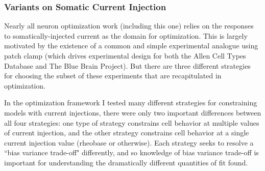 \subsubsection{Variants on Somatic Current Injection}
Nearly all neuron optimization work (including this one) relies on the responses to somatically-injected current as the domain for optimization.
This is largely motivated by the existence of a common and simple experimental analogue using patch clamp (which drives experimental design for both the Allen Cell Types Database and The Blue Brain Project).
But there are three different strategies for choosing the subset of these experiments that are recapitulated in optimization.





In the optimization framework I tested many different strategies for constraining models with current injections, there were only two important differences between all four strategies: one type of strategy constrains cell behavior at multiple values of current injection, and the other strategy constrains cell behavior at a single current injection value (rheobase or otherwise). Each strategy seeks to resolve a ``bias variance trade-off" differently, and so knowledge of bias variance trade-off is important for understanding the dramatically different quantities of fit found.

